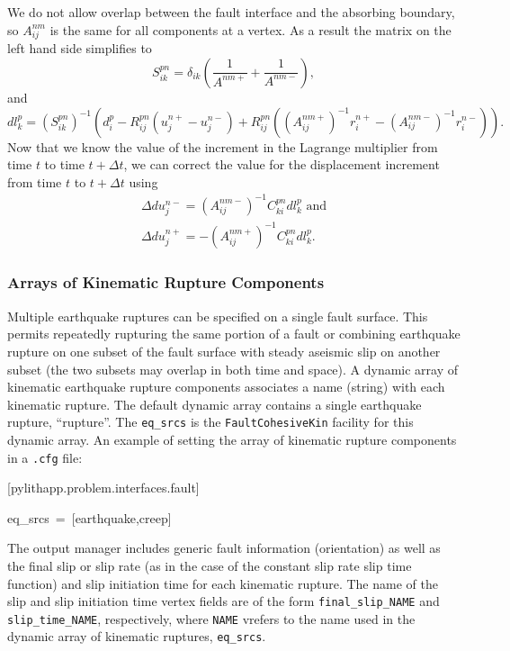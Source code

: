 We do not allow overlap between the fault interface and the absorbing
boundary, so $A_{ij}^{nm}$ is the same for all components at a vertex.
As a result the matrix on the left hand side simplifies to
\begin{equation}
S_{ik}^{pn}=\delta_{ik}\left(\frac{1}{A^{nm+}}+\frac{1}{A^{nm-}}\right),
\end{equation}
and
\begin{equation}
dl_{k}^{p}=(S_{ik}^{pn})^{-1}\left(d_{i}^{p}-R_{ij}^{pn}(u_{j}^{n+}-u_{j}^{n-})+R_{ij}^{pn}\left((A_{ij}^{nm+})^{-1}r_{i}^{n+}-(A_{ij}^{nm-})^{-1}r_{i}^{n-}\right)\right).
\end{equation}
Now that we know the value of the increment in the Lagrange multiplier
from time $t$ to time $t+\Delta t$, we can correct the value for
the displacement increment from time $t$ to $t+\Delta t$ using
\begin{gather}
\Delta du_{j}^{n-}=(A_{ij}^{nm-})^{-1}C_{ki}^{pn}dl_{k}^{p}\text{ and}\\
\Delta du_{j}^{n+}=-(A_{ij}^{nm+})^{-1}C_{ki}^{pn}dl_{k}^{p}.
\end{gather}



\subsubsection{Arrays of Kinematic Rupture Components}

Multiple earthquake ruptures can be specified on a single fault surface.
This permits repeatedly rupturing the same portion of a fault or combining
earthquake rupture on one subset of the fault surface with steady
aseismic slip on another subset (the two subsets may overlap in both
time and space). A dynamic array of kinematic earthquake rupture components
associates a name (string) with each kinematic rupture. The default
dynamic array contains a single earthquake rupture, ``rupture''. The
\texttt{eq\_srcs} is the \texttt{FaultCohesiveKin} facility for this
dynamic array. An example of setting the array of kinematic rupture
components in a \texttt{.cfg} file:
\begin{lyxcode}
{[}pylithapp.problem.interfaces.fault{]}

eq\_srcs~=~{[}earthquake,creep{]}
\end{lyxcode}
The output manager includes generic fault information (orientation)
as well as the final slip or slip rate (as in the case of the constant
slip rate slip time function) and slip initiation time for each kinematic
rupture. The name of the slip and slip initiation time vertex fields
are of the form \texttt{final\_slip\_NAME} and \texttt{slip\_time\_NAME},
respectively, where \texttt{NAME} vrefers to the name used in the dynamic
array of kinematic ruptures, \texttt{eq\_srcs}.

